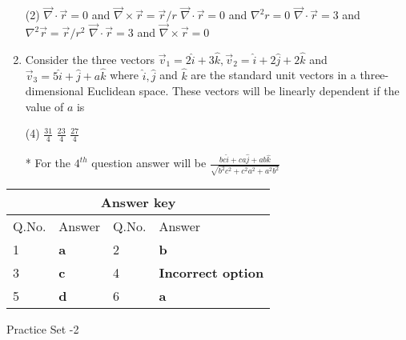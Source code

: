 \begin{enumerate}[label=\color{ocre}\textbf{\arabic*.}]
\begin{tasks}(2)
	\task[\textbf{A.}] $\vec{\nabla} \cdot \vec{r}=0$ and $\vec{\nabla} \times \vec{r}=\vec{r} / r$
	\task[\textbf{B.}] $\vec{\nabla} \cdot \vec{r}=0$ and $\nabla^{2} r=0$
	\task[\textbf{C.}] $\vec{\nabla} \cdot \vec{r}=3$ and $\nabla^{2} \vec{r}=\vec{r} / r^{2}$
	\task[\textbf{D.}] $\vec{\nabla} \cdot \vec{r}=3$ and $\vec{\nabla} \times \vec{r}=0$
\end{tasks}
\item Consider the three vectors $\vec{v}_{1}=2 \hat{i}+3 \hat{k}, \vec{v}_{2}=\hat{i}+2 \hat{j}+2 \hat{k}$ and $\vec{v}_{3}=5 \hat{i}+\hat{j}+a \hat{k}$ where $\hat{i}, \hat{j}$ and $\hat{k}$ are the standard unit vectors in a three-dimensional Euclidean space. These vectors will be linearly dependent if the value of $a$ is
{}

\begin{tasks}(4)
	\task[\textbf{A.}] $\frac{31}{4}$
	\task[\textbf{B.}] $\frac{23}{4}$
	\task[\textbf{C.}] $\frac{27}{4}$
\end{tasks}
\begin{note}
	* For the $4^{th}$ question answer will be $\frac{b c \hat{i}+c a \hat{j}+a b \hat{k}}{\sqrt{b^{2} c^{2}+c^{2} a^{2}+a^{2} b^{2}}}$
\end{note}
\end{enumerate}
\setlength\arrayrulewidth{1pt}
\begin{table}[H]
	\centering
	\begin{tabular}{|p{1.5cm}|p{1.5cm}||p{1.5cm}|p{1.5cm}|}
		\hline
		\multicolumn{4}{|c|}{\textbf{Answer key}}\\\hline\hline
		\rowcolor{ocrel}Q.No.&Answer&Q.No.&Answer\\\hline
		1&\textbf{a} &2&\textbf{b}\\\hline 
		3&\textbf{c} &4&\textbf{Incorrect option} \\\hline
		5&\textbf{d} &6&\textbf{a} \\\hline
		
		
	\end{tabular}
\end{table}
\begin{abox}
	Practice Set -2
\end{abox}	
